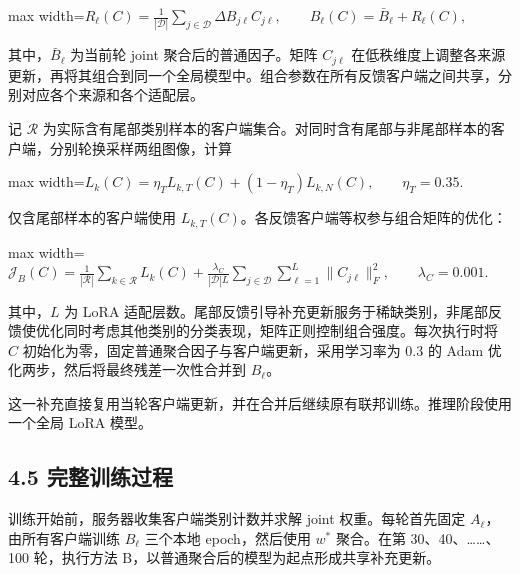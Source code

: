 \documentclass[UTF8,a4paper,10pt,fontset=fandol]{ctexart}
\begin{document}
\begin{center}\begin{adjustbox}{max width=\linewidth}$\displaystyle R_\ell(C)=\frac{1}{|\mathcal D|}
\sum_{j\in\mathcal D}\Delta B_{j\ell}C_{j\ell},
\qquad
B_\ell(C)=\bar B_\ell+R_\ell(C),$\end{adjustbox}\end{center}

其中，$\bar B_\ell$ 为当前轮 joint 聚合后的普通因子。矩阵 $C_{j\ell}$ 在低秩维度上调整各来源更新，再将其组合到同一个全局模型中。组合参数在所有反馈客户端之间共享，分别对应各个来源和各个适配层。


记 $\mathcal R$ 为实际含有尾部类别样本的客户端集合。对同时含有尾部与非尾部样本的客户端，分别轮换采样两组图像，计算


\begin{center}\begin{adjustbox}{max width=\linewidth}$\displaystyle L_k(C)=\eta_T L_{k,T}(C)+(1-\eta_T)L_{k,N}(C),
\qquad \eta_T=0.35.$\end{adjustbox}\end{center}

仅含尾部样本的客户端使用 $L_{k,T}(C)$。各反馈客户端等权参与组合矩阵的优化：


\begin{center}\begin{adjustbox}{max width=\linewidth}$\displaystyle \mathcal J_B(C)=\frac{1}{|\mathcal R|}\sum_{k\in\mathcal R}L_k(C)
+\frac{\lambda_C}{|\mathcal D|L}
\sum_{j\in\mathcal D}\sum_{\ell=1}^{L}\|C_{j\ell}\|_F^2,
\qquad \lambda_C=0.001.$\end{adjustbox}\end{center}

其中，$L$ 为 LoRA 适配层数。尾部反馈引导补充更新服务于稀缺类别，非尾部反馈使优化同时考虑其他类别的分类表现，矩阵正则控制组合强度。每次执行时将 $C$ 初始化为零，固定普通聚合因子与客户端更新，采用学习率为 0.3 的 Adam 优化两步，然后将最终残差一次性合并到 $B_\ell$。


这一补充直接复用当轮客户端更新，并在合并后继续原有联邦训练。推理阶段使用一个全局 LoRA 模型。


\subsection*{4.5 完整训练过程}

训练开始前，服务器收集客户端类别计数并求解 joint 权重。每轮首先固定 $A_\ell$，由所有客户端训练 $B_\ell$ 三个本地 epoch，然后使用 $w^*$ 聚合。在第 30、40、……、100 轮，执行方法 B，以普通聚合后的模型为起点形成共享补充更新。
\end{document}
